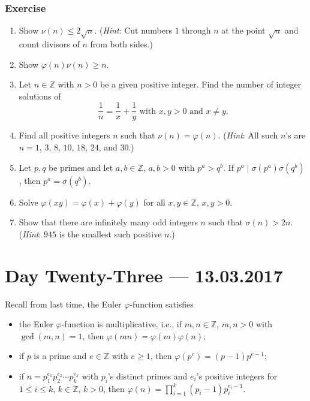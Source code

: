 \documentclass{amsbook}
\theoremstyle{plain}
\theoremstyle{definition}
\theoremstyle{remark}
\numberwithin{equation}{chapter}
\numberwithin{figure}{chapter}
\newcommand{\Z}{\mathbb{Z}}
\begin{document}
\subsection*{Exercise}
\begin{enumerate}
\item Show $\nu (n) \leqslant 2\sqrt n$. (\emph{Hint}: Cut numbers $1$ through $n$ at the point $\sqrt n$ and count divisors of $n$ from both sides.)
\item Show $\varphi (n) \nu (n) \geqslant n$.
\item Let $n \in \Z$ with $n > 0$ be a given positive integer. Find the number of integer solutions of
  \[
    \frac{1}n = \frac{1}x + \frac{1}y \text{ with $x, y > 0$ and $x \neq y$.}
  \]
\item Find all positive integers $n$ such that $\nu (n) = \varphi (n)$. (\emph{Hint}: All such $n$'s are $n = 1$, $3$, $8$, $10$, $18$, $24$, and $30$.)
\item Let $p, q$ be primes and let $a, b \in \Z$, $a, b > 0$ with $p^a > q^b$. If $p^a \mid \sigma (p^a) \sigma (q^b)$, then $p^a = \sigma (q^b)$.
\item Solve $\varphi (xy)  = \varphi (x) + \varphi (y)$ for all $x, y \in \Z$, $x, y > 0$.
\item Show that there are infinitely many odd integers $n$ such that $\sigma (n) > 2 n$. (\emph{Hint}: $945$ is the smallest such positive $n$.)
\end{enumerate}
\chapter[Lecture Twenty-Three]{Day Twenty-Three \hfill {\footnotesize \rm --- 13.03.2017}}

Recall from last time, the Euler $\varphi$-function satisfies
\begin{itemize}
\item the Euler $\varphi$-function is multiplicative, i.e., if $m, n \in \Z$, $m, n > 0$ with $\gcd (m, n) = 1$, then $\varphi (mn) = \varphi (m) \varphi (n)$;
\item if $p$ is a prime and $e \in \Z$ with $e \geqslant 1$, then $\varphi (p^e) = (p-1)p^{e-1}$;
\item if $n = p_1^{e_1} p_2^{e_2} \cdots p_k^{e_k}$ with $p_i$'s distinct primes and $e_i$'s positive integers for $1 \leqslant i \leqslant k$, $k \in \Z$, $k > 0$, then $\varphi (n) = \prod_{i=1}^k (p_i - 1)p_i^{e_i - 1}$.
\end{itemize}
\end{document}
